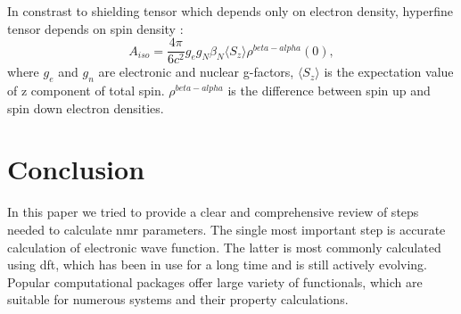 \documentclass[openany, longbibliography,slovene,a4paper,12pt]{article}
\begin{document}
  In constrast to shielding tensor which depends only on electron density,
  hyperfine tensor depends on spin density \cite{calcul_hyper_tensor_param_nmr}:
  \begin{equation}
    A_{iso}=\frac{4\pi}{6c^2}g_eg_N\beta_N\langle S_z \rangle \rho^{beta-alpha}(0),
    \end{equation}
where $g_e$ and $g_n$ are electronic and nuclear g-factors, $\langle S_z
\rangle$ is the expectation value of z component of total spin.  $\rho^{beta-alpha}$ is the difference between spin up and spin
down electron densities.

\section{Conclusion}
In this paper we tried to provide a clear and comprehensive review of steps needed
to calculate nmr parameters. The single most important step is accurate
calculation of electronic wave function. The latter is most commonly calculated
using dft, which has been in use for a long time and is still actively evolving.
Popular computational packages offer large variety of functionals, which are
suitable for numerous systems and their property calculations. 

\newpage {}




\end{document}
